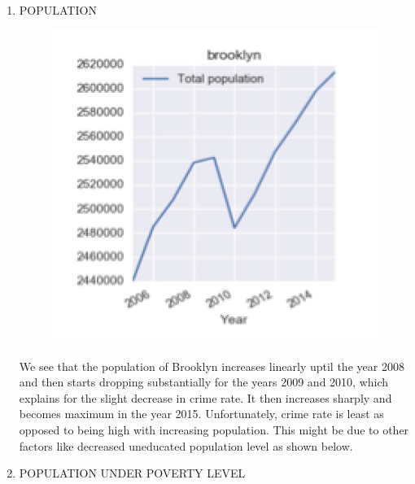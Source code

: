 \documentclass{article}
\begin{document}
\begin{itemize}
\begin{enumerate}[label=(\alph*)]
\item POPULATION

\begin{figure}[H]
\centering
\includegraphics[scale=1]{BrooklynPopulation.png}
\end{figure}

We see that the population of Brooklyn increases linearly uptil the year 2008 and then starts dropping substantially for the years 2009 and 2010, which explains for the slight decrease in crime rate. It then increases sharply and becomes maximum in the year 2015. Unfortunately, crime rate is least as opposed to being high with increasing population. This might be due to other factors like decreased uneducated population level as shown below.

\item POPULATION UNDER POVERTY LEVEL


\end{enumerate}
\end{itemize}
\end{document}
